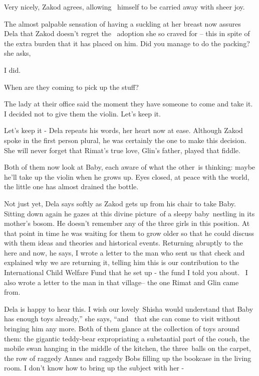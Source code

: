 \documentclass[12pt]{book}
\begin{document}
{\textquotedbl}Very nicely,{\textquotedbl} Zakod agrees, allowing \ himself to be carried away with sheer joy.

The almost palpable sensation of having a suckling at her breast now assures Dela that Zakod doesn't regret the~
adoption she so craved for -- this in spite of the extra burden that it has placed on him. {\textquotedbl}Did you
manage to do the packing?{\textquotedbl} she asks,

{\textquotedbl}I did.{\textquotedbl}

{\textquotedbl}When are they coming to pick up the stuff?{\textquotedbl}

{\textquotedbl}The lady at their office said the moment they have someone to come and take it. I decided not to give
them the violin. Let's keep it.{\textquotedbl}

{\textquotedbl}Let's keep it -{\textquotedbl} Dela repeats his words, her heart now at ease. Although Zakod spoke in the
first person plural, he was certainly the one to make this decision. She will never forget that Rimat's true love,
Glin's father, played that fiddle.

Both of them now look at Baby, each aware of what the other~is thinking: maybe he'll take up the violin when he grows
up. Eyes closed, at peace with the world, the little one has almost drained the bottle.

{\textquotedbl}Not just yet,{\textquotedbl} Dela says softly as Zakod gets up from his chair to take Baby. Sitting down
again he gazes at this divine picture~of a sleepy baby~nestling in its mother's bosom. He doesn't remember any of the
three girls in this position. At that point in time he was waiting for them to grow older so that he could discuss with
them ideas and theories and historical events. Returning abruptly to the here and now, he says, {\textquotedbl}I wrote
a letter to the man who sent us that check and explained why we are returning it, telling him this is our contribution
to the International Child Welfare Fund that he set up - the fund I told you about. ~I also wrote a letter to the man
in that village-- the one Rimat and Glin came from.{\textquotedbl}

Dela is happy to hear this. {\textquotedbl}I wish our lovely~Shisha would understand that Baby has enough toys
already,'' she says, ``and \ that she can come to visit without bringing him any more.{\textquotedbl} Both of them
glance at the collection of toys around them: the gigantic teddy-bear expropriating a substantial part of the couch,
the mobile swan hanging in the middle of the kitchen, the three~balls on the carpet, the row of raggedy Annes and
raggedy Bobs filling up the bookcase in the living room. {\textquotedbl}I don't know how to bring up the subject with
her -{\textquotedbl}
\end{document}
